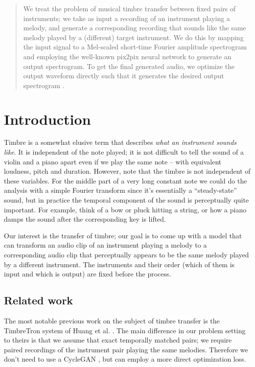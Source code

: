 \documentclass[12pt]{article}
\begin{document}
\maketitle
\begin{abstract}
We treat the problem of musical timbre transfer between fixed pairs of instruments; we take as input a recording of an instrument playing a melody, and generate a corresponding recording that sounds like the same melody played by a (different) target instrument. We do this by mapping the input signal to a Mel-scaled short-time Fourier amplitude spectrogram and employing the well-known pix2pix \cite{pix2pix} neural network to generate an output spectrogram. To get the final generated audio, we optimize the output waveform directly such that it generates the desired output spectrogram \cite{spectrogram_inv}.
\end{abstract}

\section{Introduction}
Timbre is a somewhat elusive term that describes \textit{what an instrument sounds like}. It is independent of the note played; it is not difficult to tell the sound of a violin and a piano apart even if we play the same note -- with equivalent loudness, pitch and duration. However, note that the timbre is not independent of these variables. For the middle part of a very long constant note we could do the analysis with a simple Fourier transform since it's essentially a ``steady-state'' sound, but in practice the temporal component of the sound is perceptually quite important. For example, think of a bow or pluck hitting a string, or how a piano damps the sound after the corresponding key is lifted.

Our interest is the transfer of timbre; our goal is to come up with a model that can transform an audio clip of an instrument playing a melody to a corresponding audio clip that perceptually appears to be the same melody played by a different instrument. The instruments and their order (which of them is input and which is output) are fixed before the process.

\subsection{Related work}
The most notable previous work on the subject of timbre transfer is the TimbreTron system of Huang et al. \cite{timbretron}. The main difference in our problem setting to theirs is that we assume that exact temporally matched pairs; we require paired recordings of the instrument pair playing the same melodies. Therefore we don't need to use a CycleGAN \cite{CycleGAN}, but can employ a more direct optimization loss.
\end{document}
